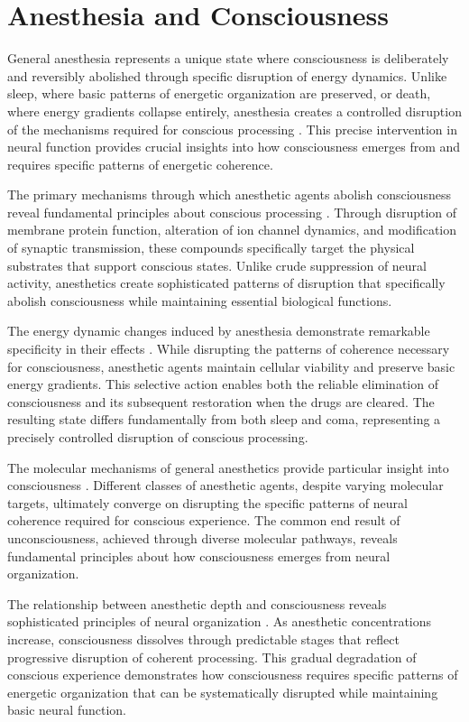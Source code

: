 \section{Anesthesia and Consciousness}

General anesthesia represents a unique state where consciousness is deliberately and reversibly abolished through specific disruption of energy dynamics. Unlike sleep, where basic patterns of energetic organization are preserved, or death, where energy gradients collapse entirely, anesthesia creates a controlled disruption of the mechanisms required for conscious processing \cite{Alkire2008}. This precise intervention in neural function provides crucial insights into how consciousness emerges from and requires specific patterns of energetic coherence.

The primary mechanisms through which anesthetic agents abolish consciousness reveal fundamental principles about conscious processing \cite{Franks2008}. Through disruption of membrane protein function, alteration of ion channel dynamics, and modification of synaptic transmission, these compounds specifically target the physical substrates that support conscious states. Unlike crude suppression of neural activity, anesthetics create sophisticated patterns of disruption that specifically abolish consciousness while maintaining essential biological functions.

The energy dynamic changes induced by anesthesia demonstrate remarkable specificity in their effects \cite{Brown2010}. While disrupting the patterns of coherence necessary for consciousness, anesthetic agents maintain cellular viability and preserve basic energy gradients. This selective action enables both the reliable elimination of consciousness and its subsequent restoration when the drugs are cleared. The resulting state differs fundamentally from both sleep and coma, representing a precisely controlled disruption of conscious processing.

The molecular mechanisms of general anesthetics provide particular insight into consciousness \cite{John2005}. Different classes of anesthetic agents, despite varying molecular targets, ultimately converge on disrupting the specific patterns of neural coherence required for conscious experience. The common end result of unconsciousness, achieved through diverse molecular pathways, reveals fundamental principles about how consciousness emerges from neural organization.

The relationship between anesthetic depth and consciousness reveals sophisticated principles of neural organization \cite{Sanders2012}. As anesthetic concentrations increase, consciousness dissolves through predictable stages that reflect progressive disruption of coherent processing. This gradual degradation of conscious experience demonstrates how consciousness requires specific patterns of energetic organization that can be systematically disrupted while maintaining basic neural function.

